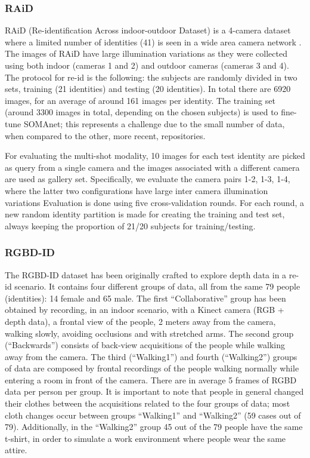 \documentclass[10pt,journal,letterpaper,compsoc]{IEEEtran}
\begin{document}
\subsubsection{RAiD}
RAiD (Re-identification Across indoor-outdoor Dataset) is a 4-camera dataset where a limited number of identities (41) is seen in a wide area camera network \cite{Das2014}. The images of RAiD  have  large  illumination  variations  as  they  were  collected  using  both indoor  (cameras  1  and  2)  and  outdoor  cameras  (cameras  3  and  4). The protocol for re-id is the following: the subjects are randomly divided  in two sets, training (21 identities) and testing (20 identities). In total there are 6920 images, for an average of around 161 images per identity.  The training set (around 3300 images in total, depending on the chosen subjects) is used to fine-tune SOMAnet; this represents a challenge due to the small number of data, when compared to the other, more recent, repositories.

For evaluating the multi-shot modality, 10 images for each test identity are picked as query from a single camera and the images associated with a different camera are used as gallery set. Specifically, we evaluate the camera pairs 1-2, 1-3, 1-4, where the latter two configurations have large inter camera illumination variations
Evaluation is done using five cross-validation rounds. For each round, a new random identity partition is made for creating the training and test set, always keeping the proportion of 21/20 subjects for training/testing.

\subsubsection{RGBD-ID}\label{Sec:RGBDdataset}

The RGBD-ID dataset has been originally crafted to explore depth data in a re-id scenario. It contains four different groups of data, all from the same 79 people (identities): 14 female and 65 male. The  first ``Collaborative'' group has been obtained by recording, in an indoor scenario, with a Kinect camera (RGB + depth data), a frontal view of the people, 2 meters away from the camera, walking slowly, avoiding occlusions and with stretched arms. The second group (``Backwards'') consists of back-view acquisitions of the people while walking away from the camera. The third (``Walking1'') and fourth (``Walking2'') groups of data are composed by frontal recordings of the people walking normally while entering a room in front of the camera. There are in average 5 frames of RGBD data per person per group. It is important to note that people in general changed their clothes between the acquisitions related to the four groups of data; most cloth changes occur between groups ``Walking1'' and ``Walking2'' (59 cases out of 79). Additionally, in the ``Walking2'' group 45 out of the 79 people have the same t-shirt, in order to simulate a work environment where people wear the same attire.
\end{document}
